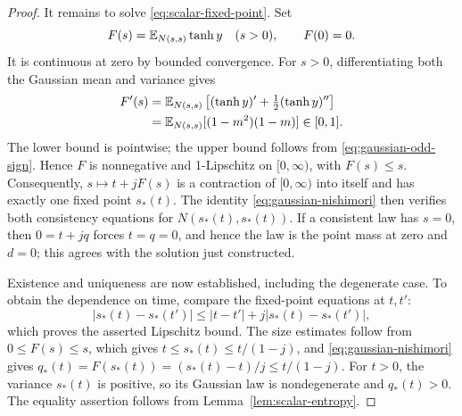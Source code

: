 \begin{proof}
It remains to solve \eqref{eq:scalar-fixed-point}.  Set
\[
 F(s)=\mathbb E_{N(s,s)}\tanh y\quad(s>0),\qquad F(0)=0.
\]
It is continuous at zero by bounded convergence.  For $s>0$,
differentiating both the Gaussian mean and variance gives
\begin{align*}
 F'(s)
 &=\mathbb E_{N(s,s)}\left[(\tanh y)'
                       +\tfrac12(\tanh y)''\right]\\
 &=\mathbb E_{N(s,s)}[(1-m^2)(1-m)]\in[0,1].
\end{align*}
The lower bound is pointwise; the upper bound follows from
\eqref{eq:gaussian-odd-sign}.  Hence $F$ is nonnegative and
1-Lipschitz on $[0,\infty)$, with $F(s)\le s$.
Consequently, $s\mapsto t+jF(s)$ is a contraction of
$[0,\infty)$ into itself and has exactly one fixed point $s_*(t)$.
The identity \eqref{eq:gaussian-nishimori} then verifies both
consistency equations for $N(s_*(t),s_*(t))$.
If a consistent law has $s=0$, then $0=t+jq$ forces $t=q=0$,
and hence the law is the point mass at zero and $d=0$; this agrees
with the solution just constructed.

Existence and uniqueness are now established, including the
degenerate case.  To obtain the dependence on time, compare the
fixed-point equations at $t,t'$:
\[
 |s_*(t)-s_*(t')|
 \le |t-t'|+j|s_*(t)-s_*(t')|,
\]
which proves the asserted Lipschitz bound.  The size estimates follow
from $0\le F(s)\le s$, which gives $t\le s_*(t)\le t/(1-j)$, and
\eqref{eq:gaussian-nishimori} gives
$q_*(t)=F(s_*(t))=(s_*(t)-t)/j\le t/(1-j)$.
For $t>0$, the variance $s_*(t)$ is positive, so its Gaussian law is
nondegenerate and $q_*(t)>0$.  The equality assertion follows from
Lemma~\ref{lem:scalar-entropy}.
\end{proof}

